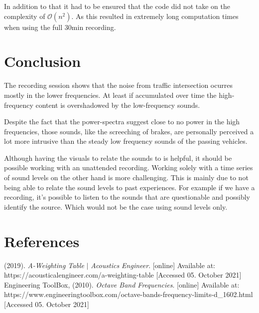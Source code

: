 \documentclass[twocolumn]{article}
\begin{document}
In addition to that it had to be ensured that the code did not take on the complexity of
$\mathcal{O}\left(n^2\right)$.
As this resulted in extremely long computation times when using the full $30\textrm{min}$ recording.

\section{Conclusion}
The recording session shows that the noise from traffic intersection ocurres mostly in the lower
frequencies.
At least if accumulated over time the high-frequency content is overshadowed by the low-frequency sounds.

Despite the fact that the power-spectra suggest close to no power in the high frequencies,
those sounds, like the screeching of brakes, are personally perceived a lot more intrusive than the steady
low frequency sounds of the passing vehicles.

Although having the visuals to relate the sounds to is helpful, it should be possible working with an
unattended recording.
Working solely with a time series of sound levels on the other hand is more challenging.
This is mainly due to not being able to relate the sound levels to past experiences.
For example if we have a recording, it's possible to listen to the sounds that are
questionable and possibly identify the source.
Which would not be the case using sound levels only.

\section{References}

\small

\begin{thebibliography}{1}
     (2019). \emph{A-Weighting Table} $|$ \emph{Acoustics Engineer}.
        [online] Available at: https://acousticalengineer.com/a-weighting-table
        [Accessed 05. October 2021]
     Engineering ToolBox, (2010). \emph{Octave Band Frequencies}.
        [online] Available at: https://www.engineeringtoolbox.com/octave-bands-frequency-limits-d\_1602.html
        [Accessed 05. October 2021]
\end{thebibliography}
\end{document}
